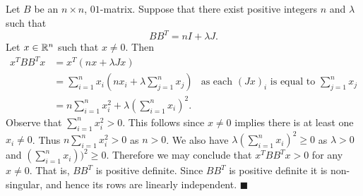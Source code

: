 \documentclass[letterpaper,12pt,oneside,onecolumn]{article}
\begin{document}
\subsection{}
\paragraph{}
Let $B$ be an $n \times n$, $01$-matrix. Suppose that there exist positive integers $n$ and $\lambda$ such that
$$BB^T = nI + \lambda J.$$
Let $x \in \mathbb{R}^n$ such that $x\neq 0$. Then 
\begin{align*}
x^T BB^T x &= x^T(nx + \lambda Jx) \\
&=\sum_{i=1}^n x_i(nx_i + \lambda \sum_{j=1}^n x_j) &\text{as each $(Jx)_i$ is equal to $\sum_{j=1}^n x_j$} \\
&= n\sum_{i=1}^n x_i^2 + \lambda (\sum_{i=1}^n x_i)^2.
\end{align*}
Observe that $\sum_{i=1}^n x_i^2 > 0$. This follows since $x \neq 0$ implies there is at least one $x_i \neq 0$. Thus $n \sum_{i=1}^n x_i^2 >0$ as $n >0$. We also have $\lambda (\sum_{i=1}^n x_i)^2 \geq 0$ as $\lambda >0$ and $(\sum_{i=1}^n x_i))^2 \geq 0$. Therefore we may conclude that $x^TBB^Tx >0$ for any $x \neq 0$. That is, $BB^T$ is positive definite. Since $BB^T$ is positive definite it is non-singular, and hence its rows are linearly independent. $\blacksquare$
\end{document}
